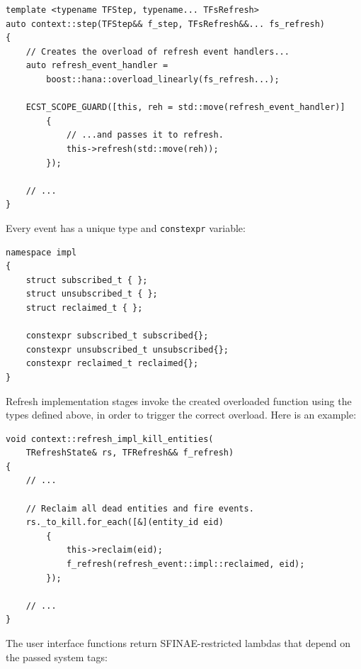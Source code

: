 \documentclass[twoside, 12pt, a4paper, openany]{book}
\begin{document}
\begin{verbatim}
template <typename TFStep, typename... TFsRefresh>
auto context::step(TFStep&& f_step, TFsRefresh&&... fs_refresh)
{
    // Creates the overload of refresh event handlers...
    auto refresh_event_handler =
        boost::hana::overload_linearly(fs_refresh...);

    ECST_SCOPE_GUARD([this, reh = std::move(refresh_event_handler)]
        {
            // ...and passes it to refresh.
            this->refresh(std::move(reh));
        });

    // ...
}
\end{verbatim}

Every event has a unique type and
\texttt{constexpr}
variable:

\begin{verbatim}
namespace impl
{
    struct subscribed_t { };
    struct unsubscribed_t { };
    struct reclaimed_t { };

    constexpr subscribed_t subscribed{};
    constexpr unsubscribed_t unsubscribed{};
    constexpr reclaimed_t reclaimed{};
}
\end{verbatim}

Refresh implementation stages invoke the created overloaded function
using the types defined above, in order to trigger the correct overload.
Here is an example:

\begin{verbatim}
void context::refresh_impl_kill_entities(
    TRefreshState& rs, TFRefresh&& f_refresh)
{
    // ...

    // Reclaim all dead entities and fire events.
    rs._to_kill.for_each([&](entity_id eid)
        {
            this->reclaim(eid);
            f_refresh(refresh_event::impl::reclaimed, eid);
        });

    // ...
}

\end{verbatim}

The user interface functions return SFINAE-restricted lambdas that
depend on the passed system tags:
\end{document}
